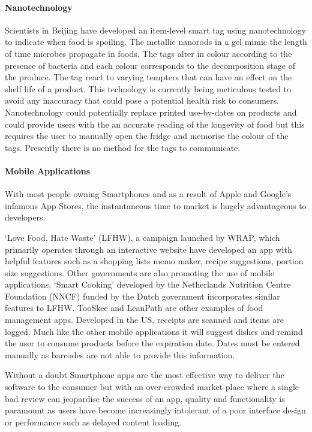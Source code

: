 \documentclass[a4paper, 11pt]{article}
\begin{document}
\paragraph{Nanotechnology}
Scientists in Beijing have developed an item-level smart tag using nanotechnology to indicate when food is spoiling. The metallic nanorods in a gel mimic the length of time microbes propagate in foods. The tags alter in colour according to the presence of bacteria and each colour corresponds to the decomposition stage of the produce. The tag react to varying tempters that can have an effect on the shelf life of a product. This technology is currently being meticulous tested to avoid any inaccuracy that could pose a potential health risk to consumers. Nanotechnology could potentially replace printed use-by-dates on products and could provide users with the an accurate reading of the longevity of food but this requires the user to manually open the fridge and memorise the colour of the tags. Presently there is no method for the tags to communicate.

\paragraph{Mobile Applications}
With most people owning Smartphones and as a result of Apple and Google's infamous App Stores, the instantaneous time to market is hugely advantageous to developers. 

`Love Food, Hate Waste' (LFHW), a campaign launched by WRAP, which primarily operates through an interactive website have developed an app with helpful features such as a shopping lists memo maker, recipe suggestions, portion size suggestions. Other governments are also promoting the use of mobile applications. `Smart Cooking' developed by the Netherlands Nutrition Centre Foundation (NNCF) funded by the Dutch government incorporates similar features to LFHW. TooSkee and LeanPath are other examples of food management apps. Developed in the US, receipts are scanned and items are logged. Much like the other mobile applications it will suggest dishes and remind the user to consume products before the expiration date. Dates must be entered manually as barcodes are not able to provide this information. 

Without a doubt Smartphone apps are the most effective way to deliver the software to the consumer but with an over-crowded market place where a single bad review can jeopardise the success of an app, quality and functionality is paramount as users have become increasingly intolerant of a poor interface design or performance such as delayed content loading.
\end{document}
